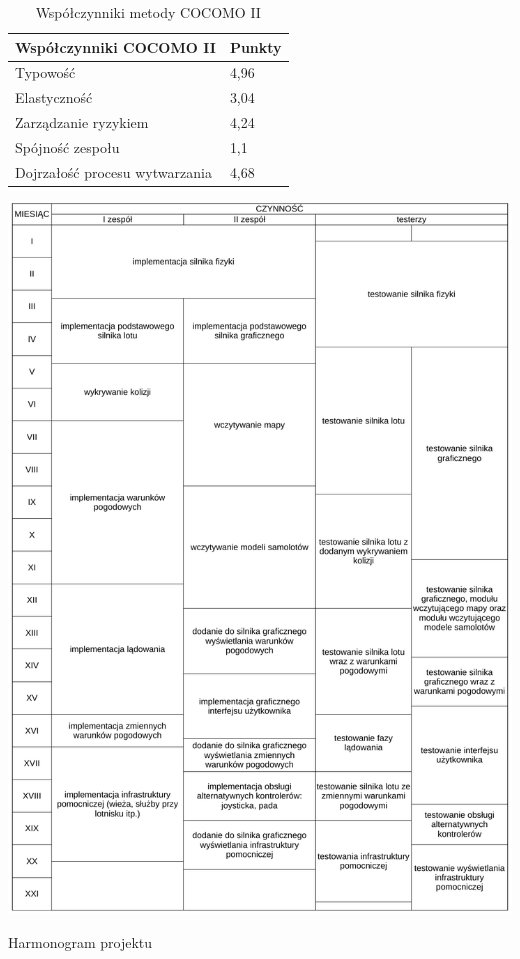 \documentclass{mwrep}
\begin{document}
\begin{table}
    \caption{Współczynniki metody COCOMO II}
    \begin{center}
        \begin{tabular}{|l|l|} \hline
        \multicolumn{1}{|m{10cm}|}{\centering Współczynniki COCOMO II } &
        \multicolumn{1}{m{2cm}|}{\centering Punkty}                    \\ \hline
        Typowość                        & 4,96 \\
        Elastyczność                    & 3,04 \\
        Zarządzanie ryzykiem            & 4,24 \\
        Spójność zespołu                & 1,1  \\
        Dojrzałość procesu wytwarzania  & 4,68 \\ \hline
        \end{tabular}
    \end{center}
\end{table}

\begin{table}
	\centerline{\includegraphics*[scale=0.8]{harmonogram-tabela.pdf}}
	\caption{Harmonogram projektu\label{harmonogram}}
\end{table}
\end{document}
